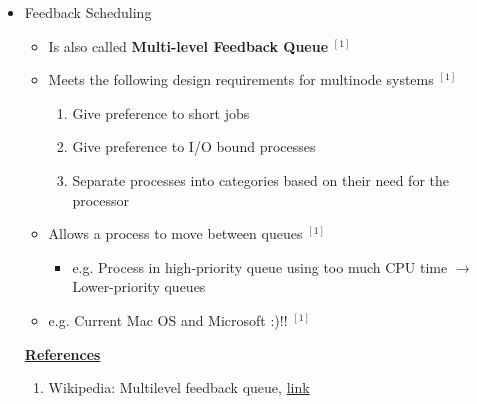 \documentclass[12pt]{article}
\begin{document}
\begin{itemize}
    \item Feedback Scheduling
    \begin{itemize}
        \item Is also called \textbf{Multi-level Feedback Queue} $^{[1]}$
        \item Meets the following design requirements for multinode systems $^{[1]}$
        \begin{enumerate}[1.]
            \item Give preference to short jobs
            \item Give preference to I/O bound processes
            \item Separate processes into categories based on their need for the
            processor
        \end{enumerate}
        \item Allows a process to move between queues $^{[1]}$
        \begin{itemize}
            \item e.g. Process in high-priority queue using too much CPU time $\to$ Lower-priority queues
        \end{itemize}
        \item e.g. Current Mac OS and Microsoft :)!! $^{[1]}$
    \end{itemize}

    \bigskip

    \underline{\textbf{References}}

    \begin{enumerate}[1)]
        \item Wikipedia: Multilevel feedback queue, \href{https://en.wikipedia.org/wiki/Multilevel_feedback_queue}{link}
    \end{enumerate}

\end{itemize}
\end{document}
